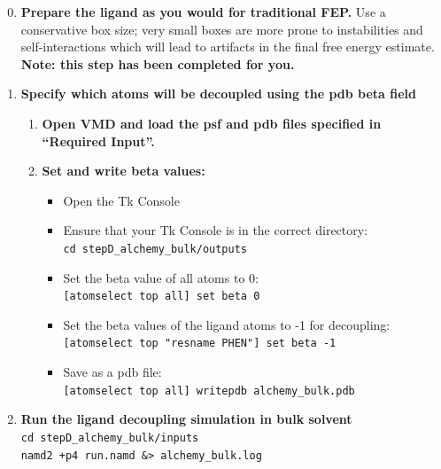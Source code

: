 \documentclass[9pt,tutorial]{Styling/livecoms}
\newcommand{\textInput}[1]{
  \texttt{#1}
}
\begin{document}
    \begin{enumerate}
    \setcounter{enumi}{-1}
        \item \textbf{Prepare the ligand as you would for traditional FEP.} Use a conservative box size; very small boxes are more prone to instabilities and self-interactions which will lead to artifacts in the final free energy estimate. \textbf{Note: this step has been completed for you.}
        \item \textbf{Specify which atoms will be decoupled using the pdb beta field}\label{step:makeFEPpdb} 
        \begin{enumerate}[label=\alph*., ref=\theenumi.\alph*]
            \item \textbf{Open VMD and load the psf and pdb files specified in ``Required Input''.}
            \item \textbf{Set and write beta values:}
            \begin{itemize}
                \item Open the Tk Console
                \item Ensure that your Tk Console is in the correct directory:\\
                \textInput{cd stepD\_alchemy\_bulk/outputs}
                \item Set the beta value of all atoms to 0:\\
                \textInput{[atomselect top all] set beta 0}
                \item Set the beta values of the ligand atoms to -1 for decoupling:\\
                \textInput{[atomselect top "resname PHEN"] set beta -1}
                \item Save as a pdb file:\\
                \textInput{[atomselect top all] writepdb alchemy\_bulk.pdb}
            \end{itemize}
        \end{enumerate}

        \item \textbf{Run the ligand decoupling simulation in bulk solvent}\\
        \textInput{cd stepD\_alchemy\_bulk/inputs}\\
        \textInput{namd2 +p4 run.namd \&> alchemy\_bulk.log}


\end{enumerate}
\end{document}
